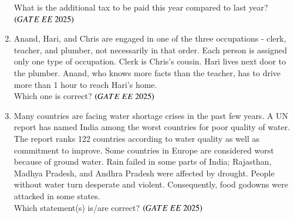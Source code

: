 \documentclass[journal,12pt,onecolumn]{IEEEtran}
\theoremstyle{remark}
\begin{document}
\begin{enumerate}
What is the additional tax to be paid this year compared to last year?
\hfill $\brak{GATE\ EE\ 2025}$
\begin{enumerate}
\end{enumerate}

\item Anand, Hari, and Chris are engaged in one of the three occupations - clerk, teacher, and plumber, not necessarily in that order. Each person is assigned only one type of occupation. Clerk is Chris's cousin. Hari lives next door to the plumber. Anand, who knows more facts than the teacher, has to drive more than 1 hour to reach Hari's home. \\
Which one is correct?
\hfill $\brak{GATE\ EE\ 2025}$
\begin{enumerate}
\end{enumerate}

\item Many countries are facing water shortage crises in the past few years. A UN report has named India among the worst countries for poor quality of water. The report ranks 122 countries according to water quality as well as commitment to improve. Some countries in Europe are considered worst because of ground water. Rain failed in some parts of India; Rajasthan, Madhya Pradesh, and Andhra Pradesh were affected by drought. People without water turn desperate and violent. Consequently, food godowns were attacked in some states. \\
Which statement(s) is/are correct?
\hfill $\brak{GATE\ EE\ 2025}$
\begin{enumerate}
\end{enumerate}


\end{enumerate}
\end{document}
